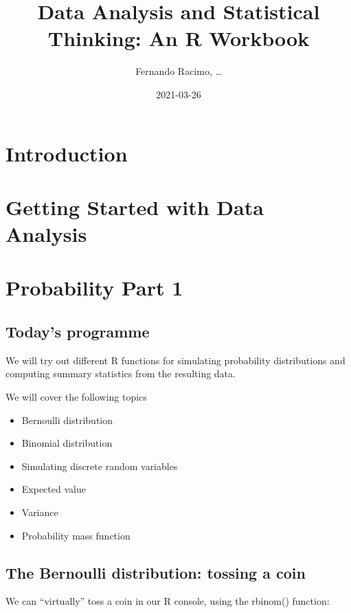 \documentclass[
]{book}
\title{Data Analysis and Statistical Thinking: An R Workbook}
\author{Fernando Racimo, \ldots{}}
\date{2021-03-26}
\providecommand{\tightlist}{%
  \setlength{\itemsep}{0pt}\setlength{\parskip}{0pt}}
\begin{document}
\maketitle

{
\setcounter{tocdepth}{1}
\tableofcontents
}
\hypertarget{introduction}{%
\chapter{Introduction}\label{introduction}}

\hypertarget{intro}{%
\chapter{Getting Started with Data Analysis}\label{intro}}

\hypertarget{prob1}{%
\chapter{Probability Part 1}\label{prob1}}

\hypertarget{todays-programme}{%
\section{Today's programme}\label{todays-programme}}

We will try out different R functions for simulating probability distributions and computing summary statistics from the resulting data.

We will cover the following topics

\begin{itemize}
\tightlist
\item
  Bernoulli distribution
\item
  Binomial distribution
\item
  Simulating discrete random variables
\item
  Expected value
\item
  Variance
\item
  Probability mass function
\end{itemize}

\hypertarget{the-bernoulli-distribution-tossing-a-coin}{%
\section{The Bernoulli distribution: tossing a coin}\label{the-bernoulli-distribution-tossing-a-coin}}

We can ``virtually'' toss a coin in our R console, using the rbinom() function:
\end{document}
